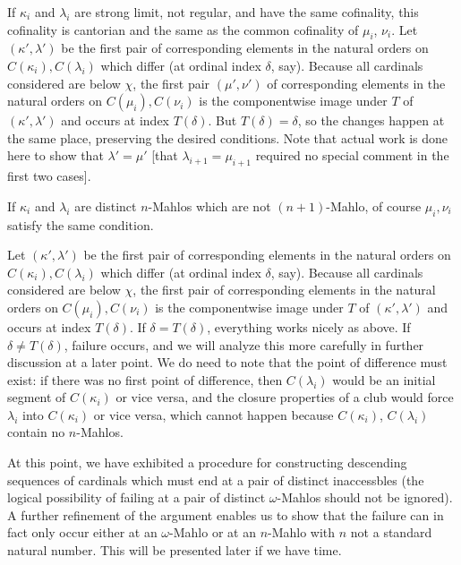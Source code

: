 \documentclass{slides}
\begin{document}
\begin{slide}

If $\kappa_i$ and $\lambda_i$ are strong limit, not regular, and have the same cofinality, this cofinality is cantorian and the same as the common cofinality
of $\mu_i$, $\nu_i$.   Let $(\kappa',\lambda')$ be the first pair of corresponding elements in the natural orders on $C(\kappa_i),C(\lambda_i)$ which differ (at ordinal index $\delta$, say).  Because all cardinals considered are below $\chi$, the first pair $(\mu',\nu')$ of corresponding elements in the natural orders on $C(\mu_i),C(\nu_i)$ is the componentwise image under
$T$ of $(\kappa',\lambda')$  and occurs at index $T(\delta)$.  But $T(\delta) = \delta$, so the changes happen at the same place, preserving the desired conditions.
Note that actual work is done here to show that $\lambda'=\mu'$ [that $\lambda_{i+1}=\mu_{i+1}$ required no special comment in the first two cases].


\end{slide}

\begin{slide}

If $\kappa_i$ and $\lambda_i$ are distinct $n$-Mahlos which are not $(n+1)$-Mahlo, of course $\mu_i,\nu_i$ satisfy the same condition.

 Let $(\kappa',\lambda')$ be the first pair of corresponding elements in the natural orders on $C(\kappa_i),C(\lambda_i)$ which differ (at ordinal index $\delta$, say).  Because all cardinals considered are below $\chi$, the first pair of corresponding elements in the natural orders on $C(\mu_i),C(\nu_i)$ is the componentwise image under
$T$ of $(\kappa',\lambda')$  and occurs at index $T(\delta)$.  If $\delta=T(\delta)$, everything works nicely as above.  If $\delta \neq T(\delta)$, failure occurs, and we will analyze this more carefully in further discussion at a later point.  We do need to note that the point of difference must exist:  if there was no first point of difference,
then $C(\lambda_i)$ would be an initial segment of $C(\kappa_i)$ or vice versa, and the closure properties of a club would force $\lambda_i$ into $C(\kappa_i)$ or
vice versa, which cannot happen because $C(\kappa_i)$, $C(\lambda_i)$ contain no $n$-Mahlos.


\end{slide}

\begin{slide}

At this point, we have exhibited a procedure for constructing descending sequences of cardinals which must end at a pair of distinct inaccessbles (the logical possibility
of failing at a pair of distinct $\omega$-Mahlos should not be ignored).  A further refinement of the argument enables us to show that the failure can in fact only
occur either at an $\omega$-Mahlo or at an $n$-Mahlo with $n$ not a standard natural number.  This will be presented later if we have time.

\end{slide}
\end{document}
